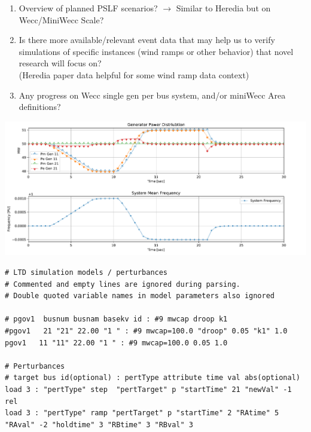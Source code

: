\documentclass[12pt]{article}
\begin{document}
\begin{multicols}{2}
\begin{enumerate}
		\item Overview of planned PSLF scenarios? $\rightarrow$ Similar to Heredia but on Wecc/MiniWecc Scale?
		
		\item Is there more available/relevant event data that may help us to verify simulations of specific instances (wind ramps or other behavior) that novel research will focus on?\\ (Heredia paper data helpful for some wind ramp data context)

		\item Any progress on Wecc single gen per bus system, and/or miniWecc Area definitions?
	\end{enumerate}
\vfill\null

\end{multicols}

\pagebreak
\begin{landscape}
\begin{centering}
\includegraphics[width=\linewidth]{pythonRamp}
\end{centering}
\vspace{-1em}
\begin{Verbatim}
# LTD simulation models / perturbances 
# Commented and empty lines are ignored during parsing.
# Double quoted variable names in model parameters also ignored

# pgov1  busnum busnam basekv id : #9 mwcap droop k1
#pgov1   21 "21" 22.00 "1 " : #9 mwcap=100.0 "droop" 0.05 "k1" 1.0
pgov1   11 "11" 22.00 "1 " : #9 mwcap=100.0 0.05 1.0

# Perturbances
# target bus id(optional) : pertType attribute time val abs(optional)
load 3 : "pertType" step  "pertTarget" p "startTime" 21 "newVal" -1 rel
load 3 : "pertType" ramp "pertTarget" p "startTime" 2 "RAtime" 5 "RAval" -2 "holdtime" 3 "RBtime" 3 "RBval" 3
\end{Verbatim}
\end{landscape}

\end{document}
